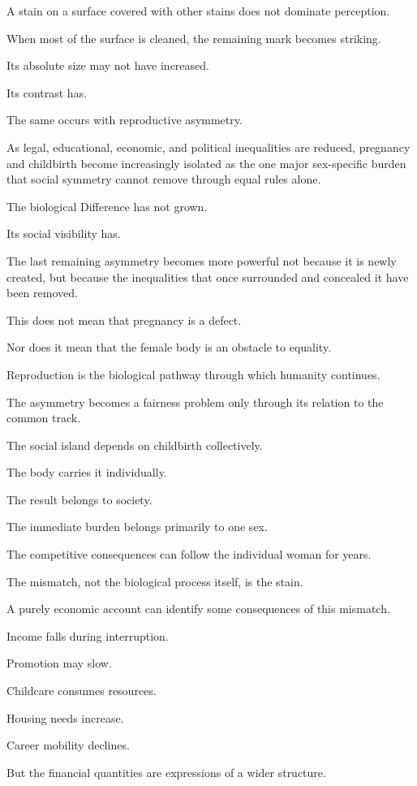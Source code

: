 A stain on a surface covered with other stains does not dominate perception.

When most of the surface is cleaned, the remaining mark becomes striking.

Its absolute size may not have increased.

Its contrast has.

The same occurs with reproductive asymmetry.

As legal, educational, economic, and political inequalities are reduced, pregnancy and childbirth become increasingly isolated as the one major sex-specific burden that social symmetry cannot remove through equal rules alone.

The biological Difference has not grown.

Its social visibility has.

The last remaining asymmetry becomes more powerful not because it is newly created, but because the inequalities that once surrounded and concealed it have been removed.

This does not mean that pregnancy is a defect.

Nor does it mean that the female body is an obstacle to equality.

Reproduction is the biological pathway through which humanity continues.

The asymmetry becomes a fairness problem only through its relation to the common track.

The social island depends on childbirth collectively.

The body carries it individually.

The result belongs to society.

The immediate burden belongs primarily to one sex.

The competitive consequences can follow the individual woman for years.

The mismatch, not the biological process itself, is the stain.

A purely economic account can identify some consequences of this mismatch.

Income falls during interruption.

Promotion may slow.

Childcare consumes resources.

Housing needs increase.

Career mobility declines.

But the financial quantities are expressions of a wider structure.

